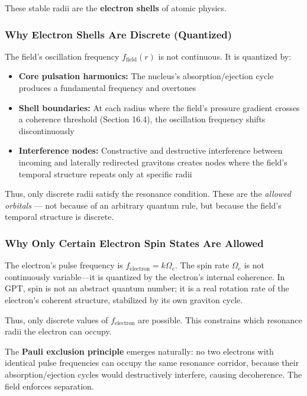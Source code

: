 \documentclass[12pt, a4paper]{article}
\begin{document}
These stable radii are the \textbf{electron shells} of atomic physics.

\subsubsection{Why Electron Shells Are Discrete (Quantized)}
\label{subsec:electron_shells_quantized}

The field's oscillation frequency \( f_{\text{field}}(r) \) is not continuous. It is quantized by:

\begin{itemize}
    \item \textbf{Core pulsation harmonics:} The nucleus's absorption/ejection cycle produces a fundamental frequency and overtones
    \item \textbf{Shell boundaries:} At each radius where the field's pressure gradient crosses a coherence threshold (Section 16.4), the oscillation frequency shifts discontinuously
    \item \textbf{Interference nodes:} Constructive and destructive interference between incoming and laterally redirected gravitons creates nodes where the field's temporal structure repeats only at specific radii
\end{itemize}

Thus, only discrete radii satisfy the resonance condition. These are the \textit{allowed orbitals} — not because of an arbitrary quantum rule, but because the field's temporal structure is discrete.

\subsubsection{Why Only Certain Electron Spin States Are Allowed}
\label{subsec:electron_spin_states}

The electron's pulse frequency is \( f_{\text{electron}} = k\Omega_e \). The spin rate \( \Omega_e \) is not continuously variable—it is quantized by the electron's internal coherence. In GPT, spin is not an abstract quantum number; it is a real rotation rate of the electron's coherent structure, stabilized by its own graviton cycle.

Thus, only discrete values of \( f_{\text{electron}} \) are possible. This constrains which resonance radii the electron can occupy.

The \textbf{Pauli exclusion principle} emerges naturally: no two electrons with identical pulse frequencies can occupy the same resonance corridor, because their absorption/ejection cycles would destructively interfere, causing decoherence. The field enforces separation.
\end{document}
